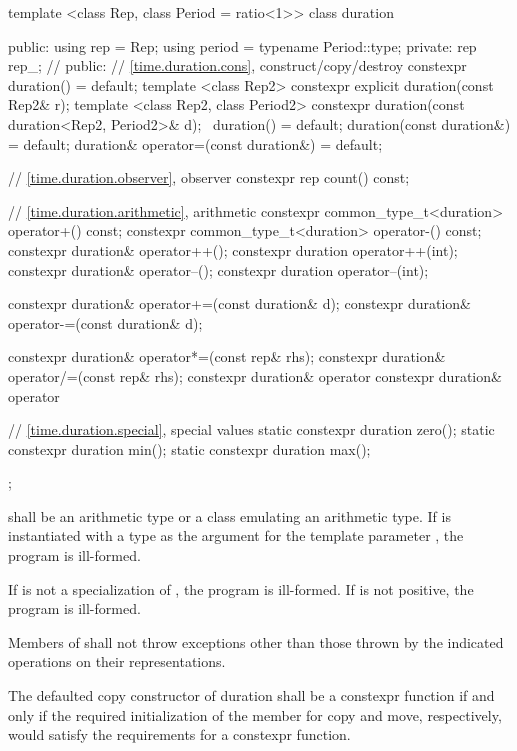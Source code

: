 %
\begin{codeblock}
template <class Rep, class Period = ratio<1>>
class duration {
public:
  using rep    = Rep;
  using period = typename Period::type;
private:
  rep rep_;  // \expos
public:
  // \ref{time.duration.cons}, construct/copy/destroy
  constexpr duration() = default;
  template <class Rep2>
      constexpr explicit duration(const Rep2& r);
  template <class Rep2, class Period2>
     constexpr duration(const duration<Rep2, Period2>& d);
  ~duration() = default;
  duration(const duration&) = default;
  duration& operator=(const duration&) = default;

  // \ref{time.duration.observer}, observer
  constexpr rep count() const;

  // \ref{time.duration.arithmetic}, arithmetic
  constexpr common_type_t<duration> operator+() const;
  constexpr common_type_t<duration> operator-() const;
  constexpr duration& operator++();
  constexpr duration  operator++(int);
  constexpr duration& operator--();
  constexpr duration  operator--(int);

  constexpr duration& operator+=(const duration& d);
  constexpr duration& operator-=(const duration& d);

  constexpr duration& operator*=(const rep& rhs);
  constexpr duration& operator/=(const rep& rhs);
  constexpr duration& operator%
  constexpr duration& operator%

  // \ref{time.duration.special}, special values
  static constexpr duration zero();
  static constexpr duration min();
  static constexpr duration max();
};
\end{codeblock}

\pnum
{} shall be an arithmetic type or a class emulating an arithmetic type.
If  is instantiated with a  type as the argument for the template
parameter , the program is ill-formed.

\pnum
If  is not a specialization of , the program is ill-formed.
If  is not positive, the program is ill-formed.

\pnum
Members of  shall not throw exceptions other than
those thrown by the indicated operations on their representations.

\pnum
The defaulted copy constructor of duration shall be a
constexpr function if and only if the required initialization
of the member  for copy and move, respectively, would
satisfy the requirements for a constexpr function.

